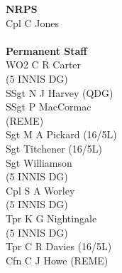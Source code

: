 \begin{multicols}{3}
  \textbf{NRPS} \\
  Cpl C Jones \\
  \\
  \textbf{Permanent Staff} \\
  WO2 C R Carter \\ \indent (5 INNIS DG) \\
  SSgt N J Harvey (QDG) \\
  SSgt P MacCormac \\ \indent (REME) \\
  Sgt M A Pickard (16/5L) \\
  Sgt Titchener (16/5L) \\
  Sgt Williamson \\ \indent (5 INNIS DG) \\
  Cpl S A Worley \\ \indent (5 INNIS DG) \\
  Tpr K G Nightingale \\ \indent (5 INNIS DG) \\
  Tpr C R Davies (16/5L) \\
  Cfn C J Howe (REME) \\
\end{multicols}
